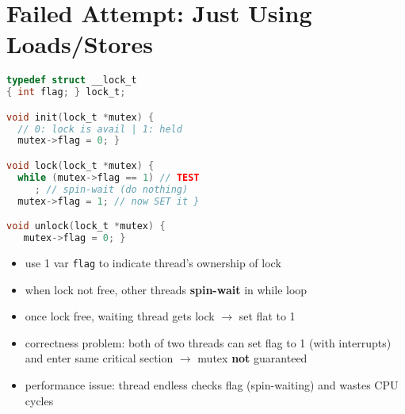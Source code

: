 \section*{Failed Attempt: Just Using Loads/Stores}
\begin{minipage}{.5\linewidth}
\begin{lstlisting}[language=c,xrightmargin=2pt]
typedef struct __lock_t
{ int flag; } lock_t;

void init(lock_t *mutex) {
  // 0: lock is avail | 1: held
  mutex->flag = 0; }

void lock(lock_t *mutex) {
  while (mutex->flag == 1) // TEST
     ; // spin-wait (do nothing)
  mutex->flag = 1; // now SET it }

void unlock(lock_t *mutex) {
   mutex->flag = 0; }
\end{lstlisting}
\end{minipage}
\begin{minipage}{.5\linewidth}
  \begin{itemize}
  \item use 1 var \texttt{flag} to indicate thread's ownership of lock
  \item when lock not free, other threads \textbf{spin-wait} in while loop
  \item once lock free, waiting thread gets lock $\to$ set flat to 1
  \item correctness problem: both of two threads can set flag to 1 (with interrupts) and enter same critical section $\to$ mutex \textbf{not} guaranteed
  \item performance issue: thread endless checks flag (spin-waiting) and wastes CPU cycles
  \end{itemize}
\end{minipage}
